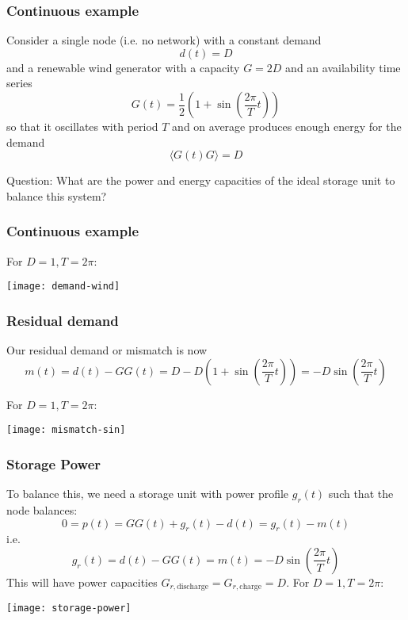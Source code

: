 \documentclass[10pt,aspectratio=169,dvipsnames]{beamer}
\begin{document}
\begin{frame}
  \frametitle{Continuous example}

  Consider a single node (i.e. no network) with a constant demand
  \begin{equation*}
    d(t) = D
  \end{equation*}
  and a renewable wind generator with a capacity $G = 2D$ and an
  availability time series
  \begin{equation*}
    G(t) = \frac{1}{2} \left(1 + \sin\left(\frac{2\pi}{T} t\right)\right)
  \end{equation*}
  so that it oscillates with period $T$ and on average produces enough energy for the demand
  \begin{equation*}
    \langle G(t) G \rangle = D
  \end{equation*}

  \alert{Question}: What are the power and energy capacities of the ideal storage unit to balance this system?
\end{frame}



\begin{frame}
  \frametitle{Continuous example}

  For $D =1, T = 2\pi$:

  \centering
  \texttt{[image: demand-wind]}
\end{frame}



\begin{frame}
  \frametitle{Residual demand}

  Our residual demand or mismatch is now
  \begin{equation*}
    m(t) = d(t) - G G(t) = D - D \left(1 + \sin\left(\frac{2\pi}{T} t\right)\right) =  -D\sin\left(\frac{2\pi}{T} t\right)
  \end{equation*}

  For $D =1, T = 2\pi$:

  \centering
\texttt{[image: mismatch-sin]}


\end{frame}

\begin{frame}
  \frametitle{Storage Power}

  To balance this, we need a storage unit with power profile $g_r(t)$ such that the node balances:
  \begin{equation*}
    0 = p(t) =  GG(t) + g_r(t) - d(t) = g_r(t) - m(t)
  \end{equation*}
  i.e.
  \begin{equation*}
    g_r(t) =  d(t) - G G(t) = m(t) =   -D\sin\left(\frac{2\pi}{T} t\right)
  \end{equation*}
  This will have power capacities $G_{r,\textrm{discharge}} = G_{r,\textrm{charge}} = D$.   For $D =1, T = 2\pi$:


  \centering
  \texttt{[image: storage-power]}

\end{frame}
\end{document}
